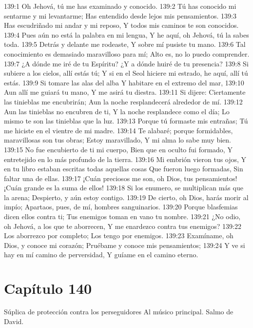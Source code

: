 139:1 Oh Jehová, tú me has examinado y conocido. 
139:2 Tú has conocido mi sentarme y mi levantarme; 
Has entendido desde lejos mis pensamientos. 
139:3 Has escudriñado mi andar y mi reposo, 
Y todos mis caminos te son conocidos. 
139:4 Pues aún no está la palabra en mi lengua, 
Y he aquí, oh Jehová, tú la sabes toda. 
139:5 Detrás y delante me rodeaste, 
Y sobre mí pusiste tu mano. 
139:6 Tal conocimiento es demasiado maravilloso para mí; 
Alto es, no lo puedo comprender. 
139:7 ¿A dónde me iré de tu Espíritu? 
¿Y a dónde huiré de tu presencia? 
139:8 Si subiere a los cielos, allí estás tú; 
Y si en el Seol hiciere mi estrado, he aquí, allí tú estás. 
139:9 Si tomare las alas del alba 
Y habitare en el extremo del mar, 
139:10 Aun allí me guiará tu mano, 
Y me asirá tu diestra. 
139:11 Si dijere: Ciertamente las tinieblas me encubrirán; 
Aun la noche resplandecerá alrededor de mí. 
139:12 Aun las tinieblas no encubren de ti, 
Y la noche resplandece como el día; 
Lo mismo te son las tinieblas que la luz. 
139:13 Porque tú formaste mis entrañas; 
Tú me hiciste en el vientre de mi madre. 
139:14 Te alabaré; porque formidables, maravillosas son tus obras; 
Estoy maravillado, 
Y mi alma lo sabe muy bien. 
139:15 No fue encubierto de ti mi cuerpo, 
Bien que en oculto fui formado, 
Y entretejido en lo más profundo de la tierra. 
139:16 Mi embrión vieron tus ojos, 
Y en tu libro estaban escritas todas aquellas cosas 
Que fueron luego formadas, 
Sin faltar una de ellas. 
139:17 ¡Cuán preciosos me son, oh Dios, tus pensamientos! 
¡Cuán grande es la suma de ellos! 
139:18 Si los enumero, se multiplican más que la arena; 
Despierto, y aún estoy contigo. 
139:19 De cierto, oh Dios, harás morir al impío; 
Apartaos, pues, de mí, hombres sanguinarios. 
139:20 Porque blasfemias dicen ellos contra ti; 
Tus enemigos toman en vano tu nombre. 
139:21 ¿No odio, oh Jehová, a los que te aborrecen, 
Y me enardezco contra tus enemigos? 
139:22 Los aborrezco por completo; 
Los tengo por enemigos. 
139:23 Examíname, oh Dios, y conoce mi corazón; 
Pruébame y conoce mis pensamientos; 
139:24 Y ve si hay en mí camino de perversidad, 
Y guíame en el camino eterno. 
\section*{Capítulo 140}
Súplica de protección contra los perseguidores 
Al músico principal. Salmo de David. 
 
